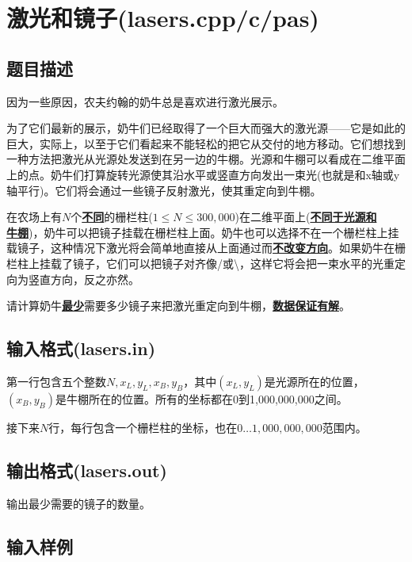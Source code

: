\documentclass[hyperref,UTF8,12pt,a4paper]{ctexart}
\begin{document}
\newpage

\section{激光和镜子(lasers.cpp/c/pas)}

\subsection{题目描述}

因为一些原因，农夫约翰的奶牛总是喜欢进行激光展示。

为了它们最新的展示，奶牛们已经取得了一个巨大而强大的激光源------它是如此的巨大，实际上，以至于它们看起来不能轻松的把它从交付的地方移动。它们想找到一种方法把激光从光源处发送到在另一边的牛棚。光源和牛棚可以看成在二维平面上的点。奶牛们打算旋转光源使其沿水平或竖直方向发出一束光(也就是和x轴或y轴平行)。它们将会通过一些镜子反射激光，使其重定向到牛棚。

在农场上有$N$个\underline{\textbf{不同}}的栅栏柱($1\le N\le300,000$)在二维平面上(\underline{\textbf{不同于光源和}}\\\underline{\textbf{牛棚}})，奶牛可以把镜子挂载在栅栏柱上面。奶牛也可以选择不在一个栅栏柱上挂载镜子，这种情况下激光将会简单地直接从上面通过而\underline{\textbf{不改变方向}}。如果奶牛在栅栏柱上挂载了镜子，它们可以把镜子对齐像/或\textbackslash，这样它将会把一束水平的光重定向为竖直方向，反之亦然。

请计算奶牛\underline{\textbf{最少}}需要多少镜子来把激光重定向到牛棚，\underline{\textbf{数据保证有解}}。

\subsection{输入格式(lasers.in)}

第一行包含五个整数$N,x_L,y_L,x_B,y_B$，其中$(x_L,y_L)$是光源所在的位置，$(x_B,y_B)$是牛棚所在的位置。所有的坐标都在0到1,000,000,000之间。

接下来$N$行，每行包含一个栅栏柱的坐标，也在$0\dots1,000,000,000$范围内。

\subsection{输出格式(lasers.out)}

输出最少需要的镜子的数量。

\subsection{输入样例}
\end{document}
